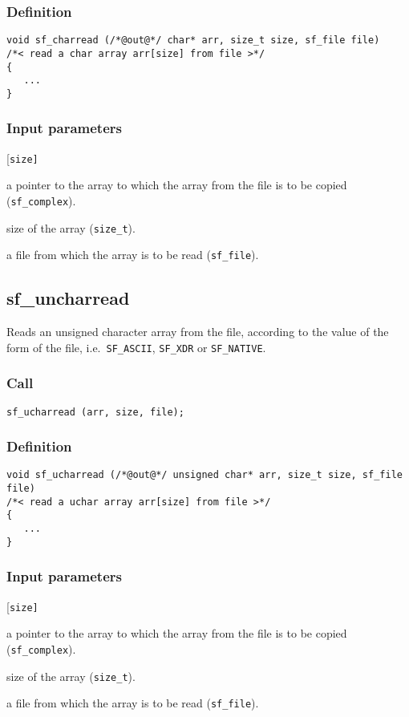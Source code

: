 \subsubsection*{Definition}
\begin{verbatim}
void sf_charread (/*@out@*/ char* arr, size_t size, sf_file file)
/*< read a char array arr[size] from file >*/
{
   ...
}
\end{verbatim}

\subsubsection*{Input parameters}
\begin{desclist}{\tt }{\quad}[\tt size]
   \setlength\itemsep{0pt}
   \item[arr] a pointer to the array to which the array from the file is to be copied (\texttt{sf\_complex}). 
   \item[size] size of the array (\texttt{size\_t}). 
   \item[file] a file from which the array is to be read (\texttt{sf\_file}).
\end{desclist}




\subsection{{sf\_uncharread}}
Reads an unsigned character array from the file, according to the value of the form of the file, i.e.~\texttt{SF\_ASCII}, \texttt{SF\_XDR} or \texttt{SF\_NATIVE}.    

\subsubsection*{Call}
\begin{verbatim}sf_ucharread (arr, size, file);\end{verbatim}

\subsubsection*{Definition}
\begin{verbatim}
void sf_ucharread (/*@out@*/ unsigned char* arr, size_t size, sf_file file)
/*< read a uchar array arr[size] from file >*/
{
   ...
}
\end{verbatim}

\subsubsection*{Input parameters}
\begin{desclist}{\tt }{\quad}[\tt size]
   \setlength\itemsep{0pt}
   \item[arr]  a pointer to the array to which the array from the file is to be copied (\texttt{sf\_complex}). 
   \item[size] size of the array (\texttt{size\_t}). 
   \item[file] a file from which the array is to be read (\texttt{sf\_file}).
\end{desclist}




